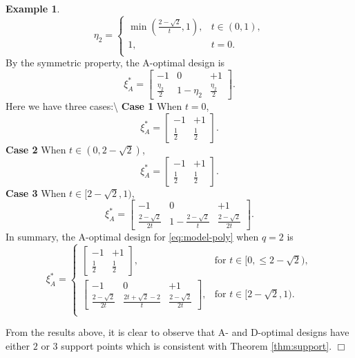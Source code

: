 \documentclass[
]{book}
\theoremstyle{definition}
\theoremstyle{definition}
\newtheorem{example}{Example}[chapter]
\theoremstyle{definition}
\theoremstyle{definition}
\theoremstyle{remark}
\begin{document}
\begin{example}
\begin{equation*} 
\eta_2 = \begin{cases} 
    \min{(\frac{2-\sqrt{2}}{t},1)},     & \mbox{$t \in(0,1)$}, \\
    1,                                  & \mbox{$t = 0$}.\\
\end{cases}
\end{equation*}
By the symmetric property, the A-optimal design is
\[  \xi_A^*=
    \begin{bmatrix}
    -1                  &   0           &   +1\\
    \frac{\eta_2}{2}    &   1-\eta_2    &   \frac{\eta_2}{2}
    \end{bmatrix}.
\]
Here we have three cases:\textbackslash{}
\textbf{Case 1}
When \(t=0\),
\[  \xi_A^*=
    \begin{bmatrix}
    -1              &   +1\\
    \frac{1}{2}     &   \frac{1}{2}
    \end{bmatrix}.
\]
\textbf{Case 2}
When \(t\in(0,2-\sqrt{2})\),
\[  \xi_A^*=
    \begin{bmatrix}
    -1              &   +1\\
    \frac{1}{2}     &   \frac{1}{2}
    \end{bmatrix}.
\]
\textbf{Case 3}
When \(t\in[2-\sqrt{2},1)\),
\[  \xi_A^*=
    \begin{bmatrix}
    -1                  &   0           &   +1\\
    \frac{2-\sqrt{2}}{2t}   &   1-\frac{2-\sqrt{2}}{t}  &   \frac{2-\sqrt{2}}{2t}
    \end{bmatrix}.
\]
In summary, the A-optimal design for \eqref{eq:model-poly} when \(q=2\) is
\begin{equation*} 
\xi_A^* = \begin{cases} 
    \begin{bmatrix}
    -1          &   +1\\
    \frac{1}{2} &   \frac{1}{2}
        \end{bmatrix},      & \mbox{for $t\in[0, \leq 2-\sqrt{2})$}, \\
    \begin{bmatrix}
    -1          &   0       &+1\\
    \frac{2-\sqrt{2}}{2t}   &\frac{2t+\sqrt{2}-2}{t}            &\frac{2-\sqrt{2}}{2t}
\end{bmatrix},                                  & \mbox{for $t\in[2-\sqrt{2},1)$}.\\
\end{cases}
\end{equation*}

From the results above, it is clear to observe that A- and D-optimal designs have either \(2\) or \(3\) support points which is consistent with Theorem \ref{thm:support}.
\hfill\(\Box\)
\end{example}
\end{document}
